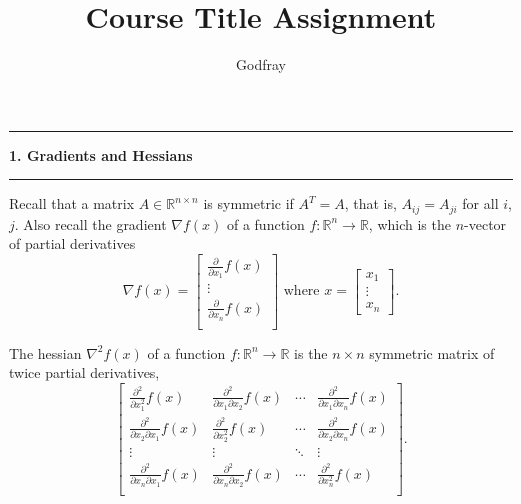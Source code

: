 \documentclass[11pt]{article}
\newcommand\question[2]{\vspace{.25in}\hrule\textbf{#1. #2}\vspace{.5em}\hrule\vspace{.10in}}
\begin{document}
\newcommand\NAME{Godfray}         %
\newcommand\STUID{}               %
\newcommand\HWNUM{0}              %



\title{\bfseries \sffamily Course Title Assignment}
\author{\sffamily \NAME}

\maketitle

\question{1}{Gradients and Hessians}
Recall that a matrix $A\in \mathbb{R}^{n\times n}$ is symmetric if $A^T = A$, that is, $A_{ij} = A_{ji}$ for all $i$, $j$. Also recall the gradient $\nabla f(x)$ of a function $f: \mathbb{R}^n \rightarrow \mathbb{R}$, which is the $n$-vector of partial derivatives $$\nabla f(x) = \left[
                                         \begin{array}{c}
                                           \frac{\partial}{\partial x_1}f(x) \\
                                           \vdots \\
                                           \frac{\partial}{\partial x_n}f(x) \\
                                         \end{array}
                                       \right]
\text{ where } x = \left[
                    \begin{array}{c}
                     x_1 \\
                     \vdots \\
                     x_n
                   \end{array}
                   \right].$$

The hessian $\nabla^2f(x)$ of a function $f: \mathbb{R}^n \rightarrow \mathbb{R}$ is the $n\times n$ symmetric matrix of twice partial derivatives,$$\left[
                                 \begin{array}{cccc}
                                   \frac{\partial^2}{\partial x_1^2}f(x) & \frac{\partial^2}{\partial x_1\partial x_2}f(x) & \cdots & \frac{\partial^2}{\partial x_1\partial x_n}f(x) \\
                                   \frac{\partial^2}{\partial x_2\partial x_1}f(x) & \frac{\partial^2}{\partial x_2^2}f(x) & \cdots & \frac{\partial^2}{\partial x_2\partial x_n}f(x) \\
                                   \vdots & \vdots & \ddots & \vdots \\
                                   \frac{\partial^2}{\partial x_n \partial x_1}f(x) & \frac{\partial^2}{\partial x_n \partial x_2}f(x) & \cdots & \frac{\partial^2}{\partial x_n^2}f(x) \\
                                 \end{array}
                               \right].$$
\end{document}
